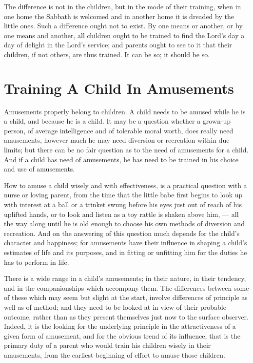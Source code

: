 \documentclass[
]{book}
\begin{document}
The difference is not in the children, but in the mode of their training, when in one home the Sabbath is welcomed and in another home it is dreaded by the little ones. Such a difference ought not to exist. By one means or another, or by one means and another, all children ought to be trained to find the Lord's day a day of delight in the Lord's service; and parents ought to see to it that their children, if not others, are thus trained. It can be so; it should be so.

\hypertarget{training-a-child-in-amusements}{%
\chapter{Training A Child In Amusements}\label{training-a-child-in-amusements}}

Amusements properly belong to children. A child needs to be amused while he is a child, and because he is a child. It may be a question whether a grown-up person, of average intelligence and of tolerable moral worth, does really need amusements, however much he may need diversion or recreation within due limits; but there can be no fair question as to the need of amusements for a child. And if a child has need of amusements, he has need to be trained in his choice and use of amusements.

How to amuse a child wisely and with effectiveness, is a practical question with a nurse or loving parent, from the time that the little babe first begins to look up with interest at a ball or a trinket swung before his eyes just out of reach of his uplifted hands, or to look and listen as a toy rattle is shaken above him, --- all the way along until he is old enough to choose his own methods of diversion and recreation. And on the answering of this question much depends for the child's character and happiness; for amusements have their influence in shaping a child's estimates of life and its purposes, and in fitting or unfitting him for the duties he has to perform in life.

There is a wide range in a child's amusements; in their nature, in their tendency, and in the companionships which accompany them. The differences between some of these which may seem but slight at the start, involve differences of principle as well as of method; and they need to be looked at in view of their probable outcome, rather than as they present themselves just now to the surface observer. Indeed, it is the looking for the underlying principle in the attractiveness of a given form of amusement, and for the obvious trend of its influence, that is the primary duty of a parent who would train his children wisely in their amusements, from the earliest beginning of effort to amuse those children.
\end{document}
